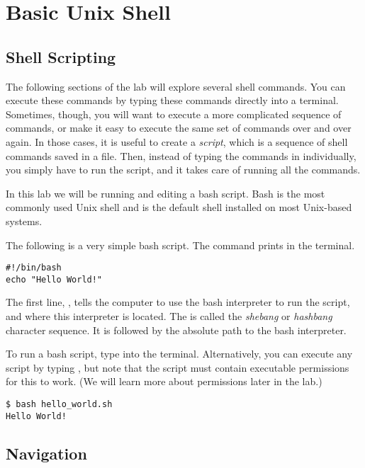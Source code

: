 \section*{Basic Unix Shell}%
\subsection*{Shell Scripting}%
The following sections of the lab will explore several shell commands. 
You can execute these commands by typing these commands directly into a terminal.
Sometimes, though, you will want to execute a more complicated sequence of commands, or make it easy to execute the same set of commands over and over again.
In those cases, it is useful to create a \emph{script}, which is a sequence of shell commands saved in a file. 
Then, instead of typing the commands in individually, you simply have to run the script, and it takes care of running all the commands.

In this lab we will be running and editing a bash script.
Bash is the most commonly used Unix shell and is the default shell installed on most Unix-based systems.

The following is a very simple bash script.
The command  prints  in the terminal. 
\begin{lstlisting}
#!/bin/bash
echo "Hello World!"
\end{lstlisting}

The first line, , tells the computer to use the bash interpreter to run the script, and where this interpreter is located. 
The \li{#\!} is called the \emph{shebang} or \emph{hashbang} character sequence.
It is followed by the absolute path to the bash interpreter.

To run a bash script, type  into the terminal.
Alternatively, you can execute any script by typing , but note that the script must contain executable permissions for this to work.
(We will learn more about permissions later in the lab.)
\begin{lstlisting}
$ bash hello_world.sh
Hello World!
\end{lstlisting}

\subsection*{Navigation} %

